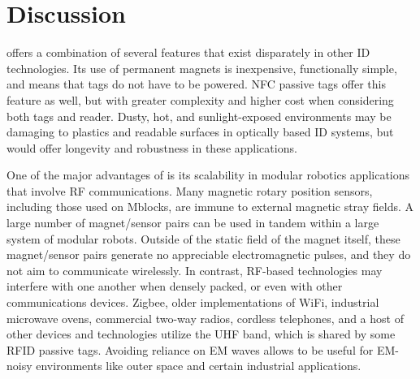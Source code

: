 \section{Discussion}
\label{sec:Discussion}

\tagName offers a combination of several features that exist disparately in other ID technologies. Its use of permanent magnets is inexpensive, functionally simple, and means that tags do not have to be powered. NFC passive tags offer this feature as well, but with greater complexity and higher cost when considering both tags and reader. Dusty, hot, and sunlight-exposed environments may be damaging to plastics and readable surfaces in optically based ID systems, but \tagName would offer longevity and robustness in these applications.

One of the major advantages of \tagName is its scalability in modular robotics applications that involve RF communications. Many magnetic rotary position sensors, including those used on Mblocks, are immune to external magnetic stray fields. A large number of magnet/sensor pairs can be used in tandem within a large system of modular robots. Outside of the static field of the magnet itself, these magnet/sensor pairs generate no appreciable electromagnetic pulses, and they do not aim to communicate wirelessly. In contrast, RF-based technologies may interfere with one another when densely packed, or even with other communications devices. Zigbee, older implementations of WiFi, industrial microwave ovens, commercial two-way radios, cordless telephones, and a host of other devices and technologies utilize the UHF band, which is shared by some RFID passive tags. Avoiding reliance on EM waves allows \tagName to be useful for EM-noisy environments like outer space and certain industrial applications.